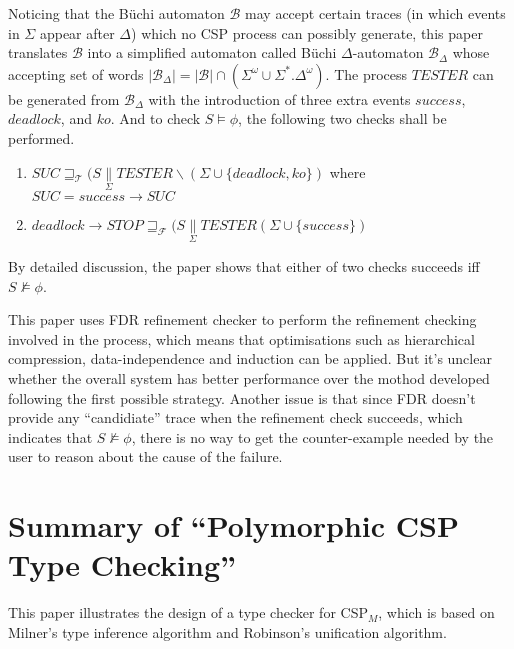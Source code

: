 \documentclass{llncs}
\newcommand{\csppre}[2]{#1 \rightarrow #2}
\newcommand{\csppara}[3]{#1 \underset{#2}{\parallel} #3}
\newcommand{\csptracesmodel}{\mathcal{T}}
\newcommand{\cspfailuresmodel}{\mathcal{F}}
\begin{document}
Noticing that the B\"uchi automaton $\mathcal{B}$ may accept certain traces
(in which events in $\Sigma$ appear after $\Delta$) which no CSP process 
can possibly generate, this paper translates $\mathcal{B}$ into a simplified
automaton called
B\"uchi $\Delta$-automaton $\mathcal{B}_\Delta$ whose accepting set of words
$|\mathcal{B}_\Delta| = |\mathcal{B}| \cap (\Sigma^\omega \cup
\Sigma^*.\Delta^\omega)$. 
The process $TESTER$ can be generated from $\mathcal{B}_\Delta$
with the introduction of three extra events $success$, $deadlock$, and $ko$.
And to check $S \models \phi$, the following two checks shall be performed.
\begin{enumerate}

\item $SUC \sqsupseteq_\csptracesmodel 
  (\csppara{S}{\Sigma}{TESTER}\backslash(\Sigma \cup \{deadlock, ko\})$ 
  where $SUC = \csppre{success}{SUC}$

\item $\csppre{deadlock}{STOP} \sqsupseteq_\cspfailuresmodel 
       (\csppara{S}{\Sigma}{TESTER}(\Sigma \cup \{success\})$ 

\end{enumerate}
By detailed discussion, the paper shows that either of two checks succeeds iff
$S \not\models \phi$.

This paper uses FDR refinement checker to perform the refinement checking
involved in the process, which means that optimisations such as hierarchical
compression, data-independence and induction can be applied. But it's unclear
whether the overall system has better performance over the mothod developed
following the first possible strategy.
Another issue is that since FDR doesn't provide any
``candidiate'' trace when the refinement check succeeds, 
which indicates that $S \not\models \phi$, there is no way to get the
counter-example needed by the user to reason about the cause of the failure.


\newpage

\section{Summary of ``Polymorphic CSP Type Checking''\cite{Gao2001Polymorphic}}
  \label{section:CSP_Type_Checking}

This paper illustrates the design of a type checker for CSP$_M$, which is based
on Milner's type inference algorithm and Robinson's unification algorithm.
\end{document}
